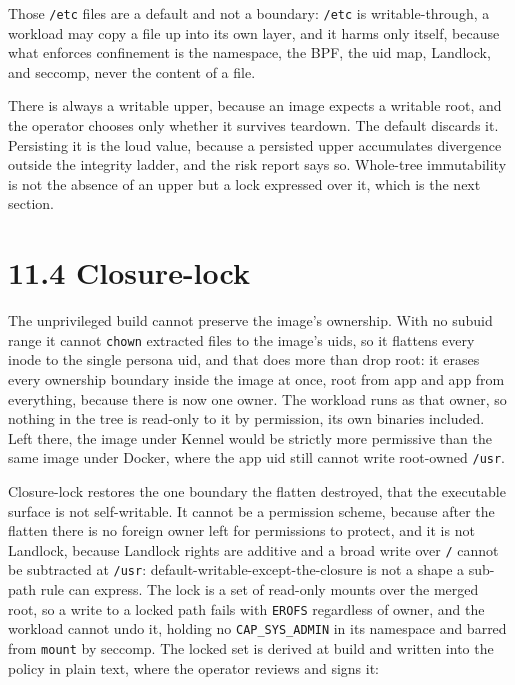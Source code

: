 Those \texttt{/etc} files are a default and not a boundary:
\texttt{/etc} is writable-through, a workload may copy a file up into
its own layer, and it harms only itself, because what enforces
confinement is the namespace, the BPF, the uid map, Landlock, and
seccomp, never the content of a file.

There is always a writable upper, because an image expects a writable
root, and the operator chooses only whether it survives teardown. The
default discards it. Persisting it is the loud value, because a
persisted upper accumulates divergence outside the integrity ladder, and
the risk report says so. Whole-tree immutability is not the absence of
an upper but a lock expressed over it, which is the next section.

\hypertarget{closure-lock}{%
\section{11.4 Closure-lock}\label{closure-lock}}

The unprivileged build cannot preserve the image's ownership. With no
subuid range it cannot \texttt{chown} extracted files to the image's
uids, so it flattens every inode to the single persona uid, and that
does more than drop root: it erases every ownership boundary inside the
image at once, root from app and app from everything, because there is
now one owner. The workload runs as that owner, so nothing in the tree
is read-only to it by permission, its own binaries included. Left there,
the image under Kennel would be strictly more permissive than the same
image under Docker, where the app uid still cannot write root-owned
\texttt{/usr}.

Closure-lock restores the one boundary the flatten destroyed, that the
executable surface is not self-writable. It cannot be a permission
scheme, because after the flatten there is no foreign owner left for
permissions to protect, and it is not Landlock, because Landlock rights
are additive and a broad write over \texttt{/} cannot be subtracted at
\texttt{/usr}: default-writable-except-the-closure is not a shape a
sub-path rule can express. The lock is a set of read-only mounts over
the merged root, so a write to a locked path fails with \texttt{EROFS}
regardless of owner, and the workload cannot undo it, holding no
\texttt{CAP\_SYS\_ADMIN} in its namespace and barred from \texttt{mount}
by seccomp. The locked set is derived at build and written into the
policy in plain text, where the operator reviews and signs it:

